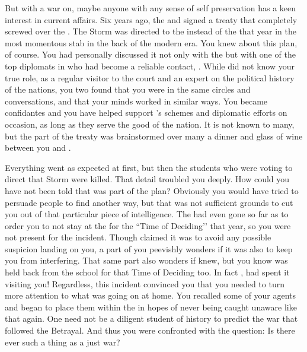 \documentclass[char]{GL2020}
\begin{document}
But with a war on, maybe anyone with any sense of self preservation has a keen interest in current affairs. Six years ago, the \pFarm{} and \pTech{} signed a treaty that completely screwed over the \pShippies{}. The Storm was directed to the \pShip{} instead of the \pTech{} that year in the most momentous stab in the back of the modern era. You knew about this plan, of course.  You had personally discussed it not only with the \cQueen{\Monarch} but with one of the top diplomats in \pFarm{} who had become a reliable contact, \cEvil{\full}. While  did not know your true role, as a regular visitor to the court and an expert on the political history of the nations, you two found that you were in the same circles and conversations, and that your minds worked in similar ways. You became confidantes and you have helped support \cEvil{}’s schemes and diplomatic efforts on occasion, as long as they serve the good of the nation. It is not known to many, but the \pFarm{} part of the treaty was brainstormed over many a dinner and glass of wine between you and \cEvil{}.

Everything went as expected at first, but then the students who were voting to direct that Storm were killed. That detail troubled you deeply. How could you have not been told that was part of the plan? Obviously you would have tried to persuade people to find another way, but that was not sufficient grounds to cut you out of that particular piece of intelligence. The \cQueen{\Monarch} had even gone so far as to order you to not stay at the \pSc{} for the ``Time of Deciding’’ that year, so you were not present for the incident. Though \cQueen{\they} claimed it was to avoid any possible suspicion landing on you, a part of you peevishly wonders if it was also to keep you from interfering. That same part also wonders if \cEvil{} knew, but you know \cEvil{} was held back from the school for that Time of Deciding too. In fact \cEvil{}, had spent it visiting you! Regardless, this incident convinced you that you needed to turn more attention to what was going on at home. You recalled some of your agents and began to place them within the \pFarm{} in hopes of never being caught unaware like that again. One need not be a diligent student of history to predict the war that followed the Betrayal. And thus you were confronted with the question: Is there ever such a thing as a just war?
\end{document}
